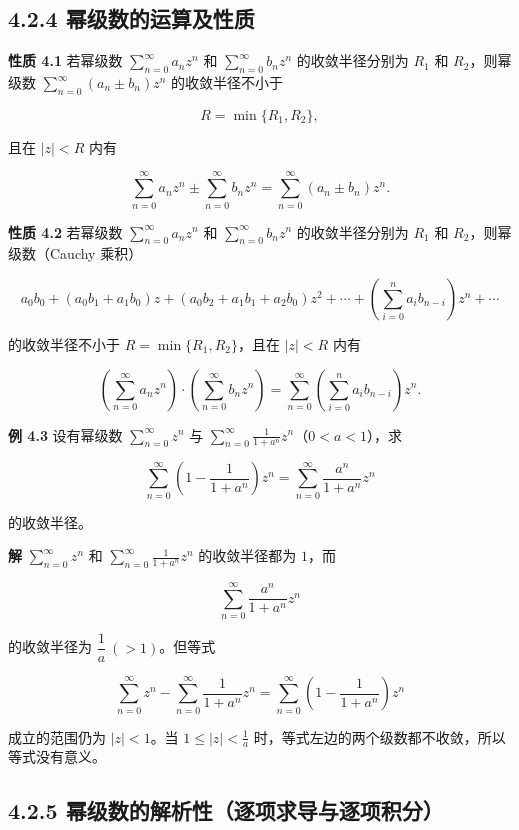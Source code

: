 \subsection{4.2.4
幂级数的运算及性质}\label{ux5e42ux7ea7ux6570ux7684ux8fd0ux7b97ux53caux6027ux8d28}

\textbf{性质 4.1} 若幂级数 \(\displaystyle\sum_{n=0}^{\infty}a_n z^n\)
和 \(\displaystyle\sum_{n=0}^{\infty}b_n z^n\) 的收敛半径分别为 \(R_1\)
和 \(R_2\)，则幂级数 \(\displaystyle\sum_{n=0}^{\infty}(a_n\pm b_n)z^n\)
的收敛半径不小于

\[
R=\min\{R_1,R_2\},
\]

且在 \(|z|<R\) 内有

\[
\sum_{n=0}^{\infty}a_n z^n\pm\sum_{n=0}^{\infty}b_n z^n=\sum_{n=0}^{\infty}(a_n\pm b_n)z^n .
\]

\textbf{性质 4.2} 若幂级数 \(\displaystyle\sum_{n=0}^{\infty}a_n z^n\)
和 \(\displaystyle\sum_{n=0}^{\infty}b_n z^n\) 的收敛半径分别为 \(R_1\)
和 \(R_2\)，则幂级数（Cauchy 乘积）

\[
a_0b_0+(a_0b_1+a_1b_0)z+(a_0b_2+a_1b_1+a_2b_0)z^2+\cdots+\left(\sum_{i=0}^{n}a_i b_{n-i}\right)z^n+\cdots
\]

的收敛半径不小于 \(R=\min\{R_1,R_2\}\)，且在 \(|z|<R\) 内有

\[
\left(\sum_{n=0}^{\infty}a_n z^n\right)\cdot\left(\sum_{n=0}^{\infty}b_n z^n\right)=\sum_{n=0}^{\infty}\left(\sum_{i=0}^{n}a_i b_{n-i}\right)z^n .
\]

\textbf{例 4.3} 设有幂级数 \(\displaystyle\sum_{n=0}^{\infty}z^n\) 与
\(\displaystyle\sum_{n=0}^{\infty}\frac{1}{1+a^n}z^n\)（\(0<a<1\)），求

\[
\sum_{n=0}^{\infty}\left(1-\frac{1}{1+a^n}\right)z^n=\sum_{n=0}^{\infty}\frac{a^n}{1+a^n}z^n
\]

的收敛半径。

\textbf{解} \(\displaystyle\sum_{n=0}^{\infty}z^n\) 和
\(\displaystyle\sum_{n=0}^{\infty}\frac{1}{1+a^n}z^n\) 的收敛半径都为
\(1\)，而

\[
\sum_{n=0}^{\infty}\frac{a^n}{1+a^n}z^n
\]

的收敛半径为 \(\dfrac{1}{a}\ (>1)\)。但等式

\[
\sum_{n=0}^{\infty}z^n-\sum_{n=0}^{\infty}\frac{1}{1+a^n}z^n=\sum_{n=0}^{\infty}\left(1-\frac{1}{1+a^n}\right)z^n
\]

成立的范围仍为 \(|z|<1\)。当 \(1\le|z|<\frac{1}{a}\)
时，等式左边的两个级数都不收敛，所以等式没有意义。

\subsection{4.2.5
幂级数的解析性（逐项求导与逐项积分）}\label{ux5e42ux7ea7ux6570ux7684ux89e3ux6790ux6027ux9010ux9879ux6c42ux5bfcux4e0eux9010ux9879ux79efux5206}

